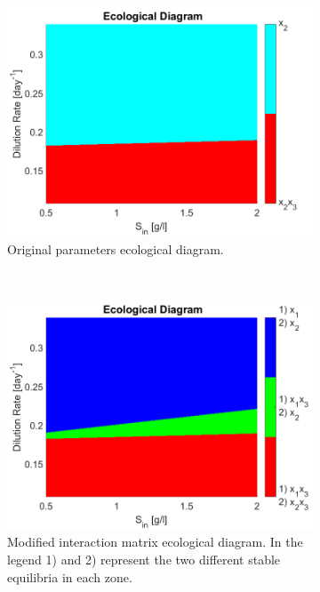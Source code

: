 \documentclass[3p,times]{article}
\begin{document}
\begin{figure}[h]
	\centering
	\begin{subfigure}[t]{0.32\textwidth}
	\includegraphics[width=\textwidth]{Stability/ED_parameters_Dumont}
	\caption{Original parameters ecological diagram.}
	\label{ED 1}
	\end{subfigure}
~
	\begin{subfigure}[t]{0.32\textwidth}
	\includegraphics[width=\textwidth]{Stability/ED_parameters_modified}
	\caption{Modified interaction matrix ecological diagram. In the legend 1) and 2) represent the two different stable equilibria in each zone.}
	\label{ED 2}
	\end{subfigure}
~
\begin{subfigure}[t]{0.32\textwidth}

\end{subfigure}
\end{figure}
\end{document}
